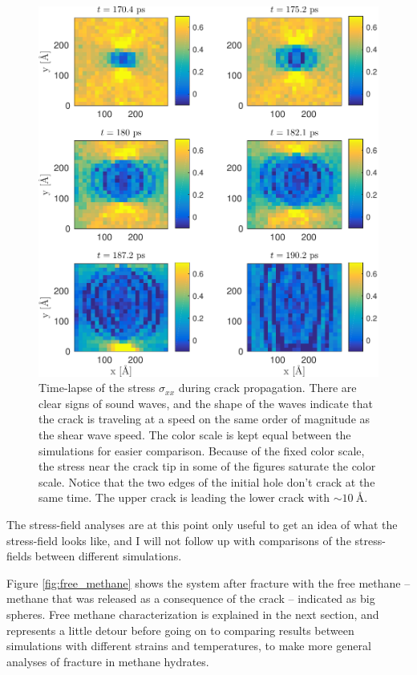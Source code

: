 \begin{figure}
\includegraphics[width=\textwidth]{../figures/thesis/stressfield_timelapse.pdf}
\caption{Time-lapse of the stress $\sigma_{xx}$ during crack propagation. There are clear signs of sound waves, and the shape of the waves indicate that the crack is traveling at a speed on the same order of magnitude as the shear wave speed. The color scale is kept equal between the simulations for easier comparison. Because of the fixed color scale, the stress near the crack tip in some of the figures saturate the color scale. Notice that the two edges of the initial hole don't crack at the same time. The upper crack is leading the lower crack 
with $\sim \SI{10}{\angstrom}$. }
\label{fig:stressfield_timelapse}
\end{figure}

The stress-field analyses are at this point only useful to get an idea of what the stress-field looks like, and I will not follow up with comparisons of the stress-fields between different simulations. 

Figure \ref{fig:free_methane} shows the system after fracture with the free methane -- methane that was released as a consequence of the crack -- indicated as big spheres. Free methane characterization is explained in the next section, and represents a little detour before going on to comparing results between simulations with different strains and temperatures, to make more general analyses of fracture in methane hydrates.

